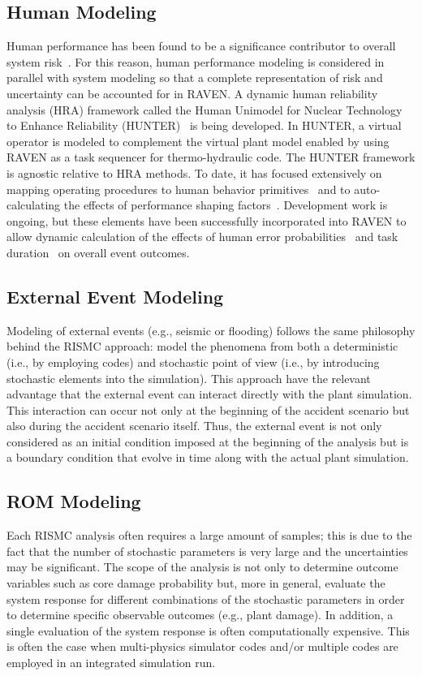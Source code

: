 \subsection{Human Modeling}
Human performance has been found to be a significance contributor to overall system 
risk~\cite{NUREG/CR-6753}. 
For this reason, human performance modeling is considered in parallel with system modeling so 
that a complete representation of risk and uncertainty can be accounted for in RAVEN. 
A dynamic human reliability analysis (HRA) framework called the Human Unimodel for 
Nuclear Technology to Enhance
Reliability (HUNTER)~\cite{boringHUNTER} is being developed. In HUNTER, a virtual operator is modeled to 
complement the virtual plant model enabled by using RAVEN as a task sequencer for thermo-hydraulic 
code. The HUNTER framework is agnostic relative to HRA methods. To date, it has focused 
extensively on mapping operating procedures to human behavior primitives~\cite{GOMSHRA} and to
auto-calculating the effects of performance shaping factors~\cite{DynamicizingSPAR}. Development work is
 ongoing, but these elements have been successfully incorporated into RAVEN to allow dynamic 
 calculation of the effects of human error probabilities~\cite{boringTaskProcedures} and task 
 duration~\cite{boringOperatorTiming} on overall event outcomes.

\subsection{External Event Modeling}
Modeling of external events (e.g., seismic or flooding) follows the same philosophy behind the RISMC
approach: model the phenomena from both a deterministic (i.e., by employing codes) and stochastic 
point of view (i.e., by introducing stochastic elements into the simulation). This approach have the 
relevant advantage that the external event can interact directly with the plant simulation. 
This interaction can occur not only at the beginning of the accident scenario but also
during the accident scenario itself. Thus, the external event is not only considered as an initial 
condition imposed at the beginning of the analysis but is a boundary condition that evolve in time 
along with the actual plant simulation.

\subsection{ROM Modeling}
Each RISMC analysis often requires a large amount of samples; this is due to the fact that the 
number of stochastic parameters is very large and the uncertainties may be significant. 
The scope of the analysis is not only to determine outcome variables such as core damage probability 
but, more in general, evaluate the system response for different combinations of the stochastic
parameters in order to determine specific observable outcomes (e.g., plant damage). In addition, 
a single evaluation of the system response is often computationally expensive. 
This is often the case when multi-physics simulator codes and/or multiple codes are employed in an 
integrated simulation run.

